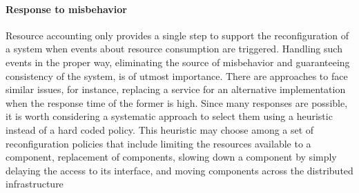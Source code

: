 \paragraph{Response to misbehavior}


Resource accounting only provides a single step to support the reconfiguration of a system when events about resource consumption are triggered.
Handling such events in the proper way, eliminating the source of misbehavior and guaranteeing  consistency  of the system, is of utmost importance.
There are approaches to face similar issues, for instance, replacing a service for an alternative implementation when the response time of the former is high.
Since many responses are possible, it is worth considering a systematic approach to select them using a heuristic instead of a hard coded policy.
This heuristic may choose among a set of reconfiguration policies that include limiting the resources available to a component, replacement of components, slowing down a component by simply delaying the access to its interface, and moving components across the distributed infrastructure


